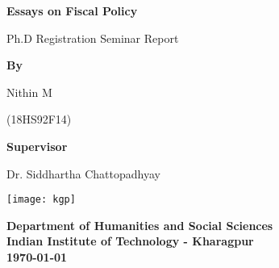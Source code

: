 
\begin{titlepage}
\bigskip
		\begin{center}
			\vspace{2cm}
			
			\textbf{\LARGE Essays on Fiscal Policy}
			\vspace{1.8cm}
			
			\large Ph.D Registration Seminar Report
			
			\vspace{1cm}
			\textbf{By}
			\vspace{0.8cm}
			
			Nithin M
			\vspace{0.1cm}
			
			(18HS92F14)
			
			\vspace{1.2cm}
				\textbf{Supervisor}
					\vspace{0.1cm}
				
				Dr. Siddhartha Chattopadhyay 
				
				\vspace{0.8cm}
				\texttt{[image: kgp]}
				
				\textbf{Department of Humanities and Social Sciences \\
				Indian Institute of Technology - Kharagpur \\
				\today }
		\end{center}
	\end{titlepage}